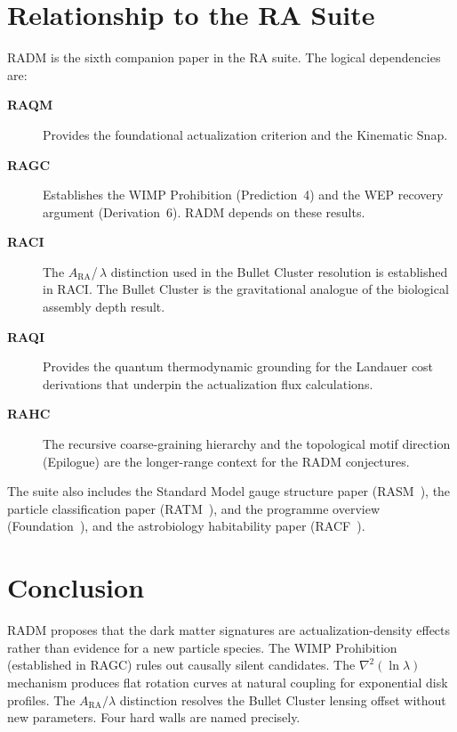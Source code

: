 \documentclass[11pt,a4paper]{article}
\theoremstyle{plain}
\theoremstyle{definition}
\theoremstyle{remark}
\newcommand{\ARA}{A_{\mathrm{RA}}}
\begin{document}
\section{Relationship to the RA Suite}
\label{sec:suite}

RADM is the sixth companion paper in the RA suite. The logical dependencies are:

\begin{description}
  \item[\textbf{RAQM}~\citep{Sandeman2026a}] Provides the foundational
    actualization criterion and the Kinematic Snap.
  \item[\textbf{RAGC}~\citep{Sandeman2026b}] Establishes the WIMP Prohibition
    (Prediction~4) and the WEP recovery argument (Derivation~6). RADM depends
    on these results.
  \item[\textbf{RACI}~\citep{Sandeman2026c}] The $\ARA$/\,$\lambda$ distinction
    used in the Bullet Cluster resolution is established in RACI. The Bullet
    Cluster is the gravitational analogue of the biological assembly depth result.
  \item[\textbf{RAQI}~\citep{Sandeman2026d}] Provides the quantum thermodynamic
    grounding for the Landauer cost derivations that underpin the actualization
    flux calculations.
  \item[\textbf{RAHC}~\citep{Sandeman2026RAHC}] The recursive coarse-graining
    hierarchy and the topological motif direction (Epilogue) are the longer-range
    context for the RADM conjectures.
\end{description}

\noindent
The suite also includes the Standard Model gauge structure paper
(RASM~\citep{Sandeman2026RASM}), the particle classification
paper (RATM~\citep{Sandeman2026RATM}), and the programme overview
(Foundation~\citep{Sandeman2026Foundation}), and the astrobiology
habitability paper (RACF~\citep{Sandeman2026RACF}).


\section{Conclusion}
\label{sec:conclusion}

RADM proposes that the dark matter signatures are actualization-density effects
rather than evidence for a new particle species. The WIMP Prohibition (established
in RAGC) rules out causally silent candidates. The $\nabla^2(\ln\lambda)$
mechanism produces flat rotation curves at natural coupling for exponential disk
profiles. The $\ARA/\lambda$ distinction resolves the Bullet Cluster lensing
offset without new parameters. Four hard walls are named precisely.
\end{document}
